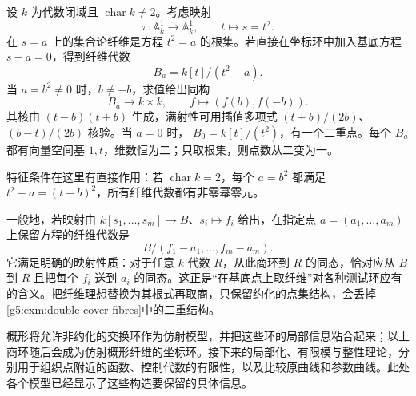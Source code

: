 \begin{example}\label{g5:exm:double-cover-fibres}
	设 \(k\) 为代数闭域且 \(\operatorname{char}k\ne2\)。考虑映射
	\[
		\pi:\mathbb A_k^1\longrightarrow\mathbb A_k^1,\qquad t\longmapsto s=t^2.
	\]
	在 \(s=a\) 上的集合论纤维是方程 \(t^2=a\) 的根集。若直接在坐标环中加入基底方程 \(s-a=0\)，得到纤维代数
	\[
		B_a=k[t]/(t^2-a).
	\]
	当 \(a=b^2\ne0\) 时，\(b\ne-b\)，求值给出同构
	\[
		B_a\longrightarrow k\times k,\qquad f\longmapsto(f(b),f(-b)).
	\]
	其核由 \((t-b)(t+b)\) 生成，满射性可用插值多项式 \((t+b)/(2b)\)、\((b-t)/(2b)\) 核验。当 \(a=0\) 时，
	\(B_0=k[t]/(t^2)\)，有一个二重点。每个 \(B_a\) 都有向量空间基 \(1,t\)，维数恒为二；只取根集，则点数从二变为一。

	特征条件在这里有直接作用：若 \(\operatorname{char}k=2\)，每个 \(a=b^2\) 都满足 \(t^2-a=(t-b)^2\)，所有纤维代数都有非零幂零元。
\end{example}

一般地，若映射由 \(k[s_1,\ldots,s_m]\rightarrow B\)、\(s_i\mapsto f_i\) 给出，在指定点 \(a=(a_1,\ldots,a_m)\) 上保留方程的纤维代数是
\[
	B/(f_1-a_1,\ldots,f_m-a_m).
\]
它满足明确的映射性质：对于任意 \(k\) 代数 \(R\)，从此商环到 \(R\) 的同态，恰对应从 \(B\) 到 \(R\) 且把每个 \(f_i\) 送到 \(a_i\) 的同态。这正是“在基底点上取纤维”对各种测试环应有的含义。把纤维理想替换为其根式再取商，只保留约化的点集结构，会丢掉\cref{g5:exm:double-cover-fibres}中的二重结构。

\ProseParagraphBreak

概形将允许非约化的交换环作为仿射模型，并把这些环的局部信息粘合起来；以上商环随后会成为仿射概形纤维的坐标环。接下来的局部化、有限模与整性理论，分别用于组织点附近的函数、控制代数的有限性，以及比较原曲线和参数曲线。此处各个模型已经显示了这些构造要保留的具体信息。
